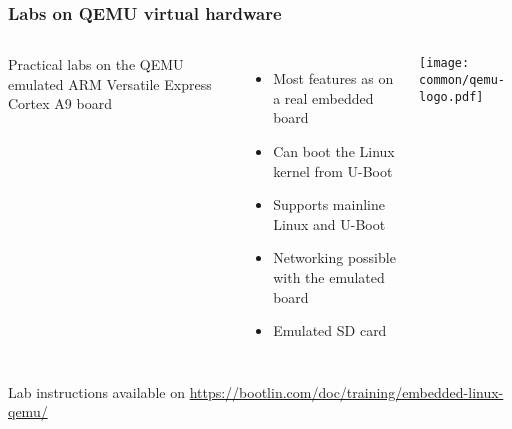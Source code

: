 \begin{frame}
\frametitle{Labs on QEMU virtual hardware}
  \begin{columns}
    Practical labs on the QEMU emulated
    ARM Versatile Express Cortex A9 board
    \begin{itemize}
    \item Most features as on a real embedded board
    \item Can boot the Linux kernel from U-Boot
    \item Supports mainline Linux and U-Boot
    \item Networking possible with the emulated board
    \item Emulated SD card
    \end{itemize}
    \texttt{[image: common/qemu-logo.pdf]}
  \end{columns}
  \vspace{1cm}
  Lab instructions available on
  \url{https://bootlin.com/doc/training/embedded-linux-qemu/}
\end{frame}
